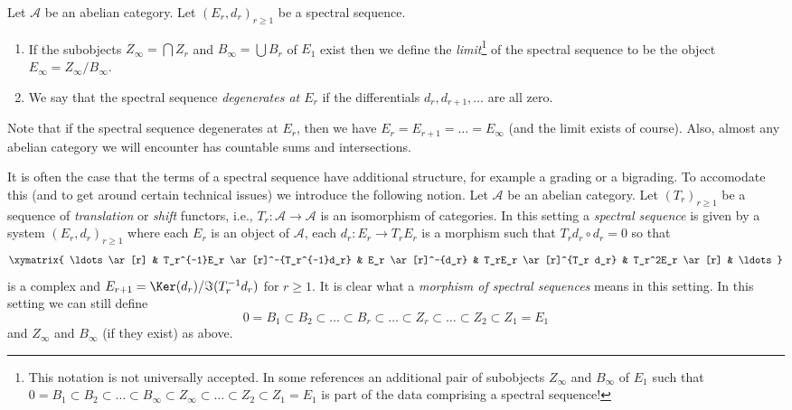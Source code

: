 \begin{definition}
\label{definition-limit-spectral-sequence}
Let $\mathcal{A}$ be an abelian category.
Let $(E_r, d_r)_{r \geq 1}$ be a spectral sequence.
\begin{enumerate}
\item If the subobjects $Z_{\infty} = \bigcap Z_r$
and $B_{\infty} = \bigcup B_r$ of $E_1$ exist then we define
the {\it limit}\footnote{This notation is not universally accepted. In some
references an additional pair of subobjects
$Z_\infty$ and $B_\infty$ of $E_1$ such that
$0 = B_1 \subset B_2 \subset \ldots \subset B_\infty \subset Z_\infty
\subset \ldots \subset Z_2 \subset Z_1 = E_1$
is part of the data comprising a spectral sequence!}
of the spectral sequence to be the object
$E_{\infty} = Z_{\infty}/B_{\infty}$.
\item We say that the spectral sequence {\it degenerates at $E_r$}
if the differentials $d_r, d_{r + 1}, \ldots$ are all zero.
\end{enumerate}
\end{definition}

\noindent
Note that if the spectral sequence degenerates at $E_r$, then
we have $E_r = E_{r + 1} = \ldots = E_{\infty}$ (and the limit
exists of course). Also, almost any abelian category we will encounter
has countable sums and intersections.

\begin{remark}[Variant]
\label{remark-allow-translation-functors}
It is often the case that the terms of a spectral sequence have
additional structure, for example a grading or a bigrading.
To accomodate this (and to get around certain technical issues)
we introduce the following notion. Let $\mathcal{A}$ be an
abelian category. Let $(T_r)_{r \geq 1}$ be a
sequence of {\it translation} or {\it shift} functors, i.e.,
$T_r : \mathcal{A} \to \mathcal{A}$ is an isomorphism of categories.
In this setting a {\it spectral sequence} is given by a system
$(E_r, d_r)_{r \geq 1}$ where each $E_r$ is an object of
$\mathcal{A}$, each $d_r : E_r \to T_rE_r$
is a morphism such that $T_rd_r \circ d_r = 0$ so that
$$
\xymatrix{
\ldots \ar[r] &
T_r^{-1}E_r \ar[r]^-{T_r^{-1}d_r} &
E_r \ar[r]^-{d_r} &
T_rE_r \ar[r]^{T_r d_r} &
T_r^2E_r \ar[r] & \ldots
}
$$
is a complex and $E_{r + 1} = \Ker(d_r)/\Im(T_r^{-1}d_r)$ for $r \geq 1$.
It is clear what a {\it morphism of spectral sequences}
means in this setting. In this setting we can still define
$$
0 = B_1 \subset B_2 \subset \ldots \subset B_r \subset \ldots
\subset Z_r \subset \ldots \subset Z_2 \subset Z_1 = E_1
$$
and $Z_\infty$ and $B_\infty$ (if they exist) as above.
\end{remark}










